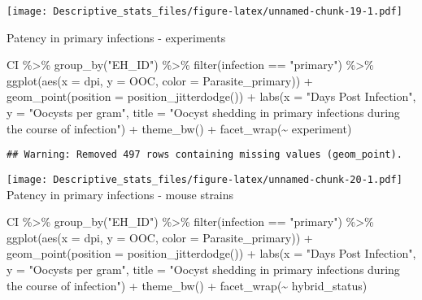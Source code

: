 \documentclass[
]{article}
\newenvironment{Shaded}{\begin{snugshade}}{\end{snugshade}}
\newcommand{\AttributeTok}[1]{\textcolor[rgb]{0.77,0.63,0.00}{#1}}
\newcommand{\FunctionTok}[1]{\textcolor[rgb]{0.00,0.00,0.00}{#1}}
\newcommand{\NormalTok}[1]{#1}
\newcommand{\SpecialCharTok}[1]{\textcolor[rgb]{0.00,0.00,0.00}{#1}}
\newcommand{\StringTok}[1]{\textcolor[rgb]{0.31,0.60,0.02}{#1}}
\begin{document}
\texttt{[image: Descriptive\_stats\_files/figure-latex/unnamed-chunk-19-1.pdf]}

Patency in primary infections - experiments

\begin{Shaded}
\begin{Highlighting}[]
\NormalTok{CI }\SpecialCharTok{\%\textgreater{}\%}
  \FunctionTok{group\_by}\NormalTok{(}\StringTok{"EH\_ID"}\NormalTok{) }\SpecialCharTok{\%\textgreater{}\%}
  \FunctionTok{filter}\NormalTok{(infection }\SpecialCharTok{==} \StringTok{"primary"}\NormalTok{) }\SpecialCharTok{\%\textgreater{}\%}
  \FunctionTok{ggplot}\NormalTok{(}\FunctionTok{aes}\NormalTok{(}\AttributeTok{x =}\NormalTok{ dpi, }\AttributeTok{y =}\NormalTok{ OOC, }\AttributeTok{color =}\NormalTok{ Parasite\_primary)) }\SpecialCharTok{+}
  \FunctionTok{geom\_point}\NormalTok{(}\AttributeTok{position =} \FunctionTok{position\_jitterdodge}\NormalTok{()) }\SpecialCharTok{+}
  \FunctionTok{labs}\NormalTok{(}\AttributeTok{x =} \StringTok{"Days Post Infection"}\NormalTok{, }\AttributeTok{y =} \StringTok{"Oocysts per gram"}\NormalTok{,}
       \AttributeTok{title =} \StringTok{"Oocyst shedding in primary infections during the }
\StringTok{       course of infection"}\NormalTok{) }\SpecialCharTok{+}
    \FunctionTok{theme\_bw}\NormalTok{() }\SpecialCharTok{+}
    \FunctionTok{facet\_wrap}\NormalTok{(}\SpecialCharTok{\textasciitilde{}}\NormalTok{ experiment)}
\end{Highlighting}
\end{Shaded}

\begin{verbatim}
## Warning: Removed 497 rows containing missing values (geom_point).
\end{verbatim}

\texttt{[image: Descriptive\_stats\_files/figure-latex/unnamed-chunk-20-1.pdf]}
Patency in primary infections - mouse strains

\begin{Shaded}
\begin{Highlighting}[]
\NormalTok{CI }\SpecialCharTok{\%\textgreater{}\%}
  \FunctionTok{group\_by}\NormalTok{(}\StringTok{"EH\_ID"}\NormalTok{) }\SpecialCharTok{\%\textgreater{}\%}
  \FunctionTok{filter}\NormalTok{(infection }\SpecialCharTok{==} \StringTok{"primary"}\NormalTok{) }\SpecialCharTok{\%\textgreater{}\%}
  \FunctionTok{ggplot}\NormalTok{(}\FunctionTok{aes}\NormalTok{(}\AttributeTok{x =}\NormalTok{ dpi, }\AttributeTok{y =}\NormalTok{ OOC, }\AttributeTok{color =}\NormalTok{ Parasite\_primary)) }\SpecialCharTok{+}
  \FunctionTok{geom\_point}\NormalTok{(}\AttributeTok{position =} \FunctionTok{position\_jitterdodge}\NormalTok{()) }\SpecialCharTok{+}
  \FunctionTok{labs}\NormalTok{(}\AttributeTok{x =} \StringTok{"Days Post Infection"}\NormalTok{, }\AttributeTok{y =} \StringTok{"Oocysts per gram"}\NormalTok{,}
       \AttributeTok{title =} \StringTok{"Oocyst shedding in primary infections during the }
\StringTok{       course of infection"}\NormalTok{) }\SpecialCharTok{+}
    \FunctionTok{theme\_bw}\NormalTok{() }\SpecialCharTok{+}
    \FunctionTok{facet\_wrap}\NormalTok{(}\SpecialCharTok{\textasciitilde{}}\NormalTok{ hybrid\_status)}
\end{Highlighting}
\end{Shaded}
\end{document}
